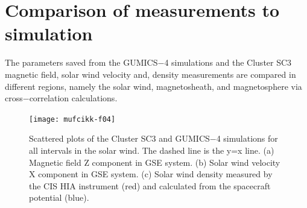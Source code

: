 \documentclass[b5paper,10pt]{article}
\begin{document}
\section{Comparison of measurements to simulation}
\label{sec:comp}

The parameters saved from the GUMICS$-$4 simulations and the Cluster SC3 magnetic field, solar wind velocity and, density measurements are compared in different regions, namely the solar wind, magnetosheath, and magnetosphere via cross$-$correlation calculations. %

\begin{figure}[t]
\centering
\texttt{[image: mufcikk-f04]}
\caption{Scattered plots of the Cluster SC3 and GUMICS$-$4 simulations for all intervals in the solar wind. The dashed line is the y=x line. (a) Magnetic field Z component in GSE system. (b) Solar wind velocity X component in GSE system. (c) Solar wind density measured by the CIS HIA instrument (red) and calculated from the spacecraft potential (blue).}
\label{fig:swscatplot}
\end{figure}
\end{document}
